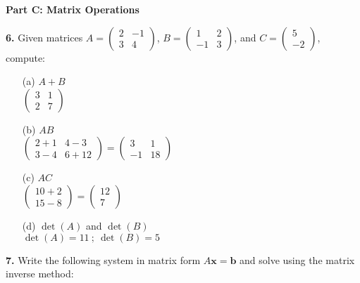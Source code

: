 \documentclass[12pt]{article}
\begin{document}
\newpage

\textbf{Part C: Matrix Operations}

\textbf{6.} Given matrices $A = \begin{pmatrix} 2 & -1 \\ 3 & 4 \end{pmatrix}$, $B = \begin{pmatrix} 1 & 2 \\ -1 & 3 \end{pmatrix}$, and $C = \begin{pmatrix} 5 \\ -2 \end{pmatrix}$, compute:

\begin{enumerate}
\item[(a)] $A + B$
\\[8pt] $\begin{pmatrix} 3 & 1 \\ 2 & 7 \end{pmatrix}$

\item[(b)] $AB$
\\[8pt] $\begin{pmatrix} 2+1 & 4-3 \\ 3-4 & 6+12 \end{pmatrix} = \begin{pmatrix} 3 & 1 \\ -1 & 18 \end{pmatrix}$

\item[(c)] $AC$
\\[8pt] $\begin{pmatrix} 10+2 \\ 15-8 \end{pmatrix} = \begin{pmatrix} 12 \\ 7 \end{pmatrix}$

\item[(d)] $\det(A)$ and $\det(B)$
\\[8pt] $\det(A)=11 \ ; \ \det(B)=5$
\end{enumerate}

\textbf{7.} Write the following system in matrix form $A\mathbf{x} = \mathbf{b}$ and solve using the matrix inverse method:
\end{document}
